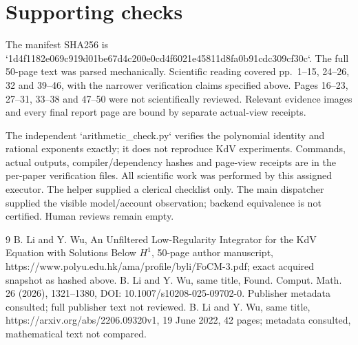 \documentclass[10pt]{article}
\begin{document}
\section*{Supporting checks}
The manifest SHA256 is `1d4f1182e069c919d01be67d4c200e0cd4f6021e45811d8fa0b91cdc309cf30c`. The full 50-page text was parsed mechanically. Scientific reading covered pp. 1–15, 24–26, 32 and 39–46, with the narrower verification claims specified above. Pages 16–23, 27–31, 33–38 and 47–50 were not scientifically reviewed. Relevant evidence images and every final report page are bound by separate actual-view receipts.\par
The independent `arithmetic\_check.py` verifies the polynomial identity and rational exponents exactly; it does not reproduce KdV experiments. Commands, actual outputs, compiler/dependency hashes and page-view receipts are in the per-paper verification files. All scientific work was performed by this assigned executor. The helper supplied a clerical checklist only. The main dispatcher supplied the visible model/account observation; backend equivalence is not certified. Human reviews remain empty.\par
9 B. Li and Y. Wu, An Unfiltered Low-Regularity Integrator for the KdV Equation with Solutions Below \(H^1\), 50-page author manuscript, https://www.polyu.edu.hk/ama/profile/byli/FoCM-3.pdf; exact acquired snapshot as hashed above. B. Li and Y. Wu, same title, Found. Comput. Math. 26 (2026), 1321–1380, DOI: 10.1007/s10208-025-09702-0. Publisher metadata consulted; full publisher text not reviewed. B. Li and Y. Wu, same title, https://arxiv.org/abs/2206.09320v1, 19 June 2022, 42 pages; metadata consulted, mathematical text not compared.\par
\end{document}
